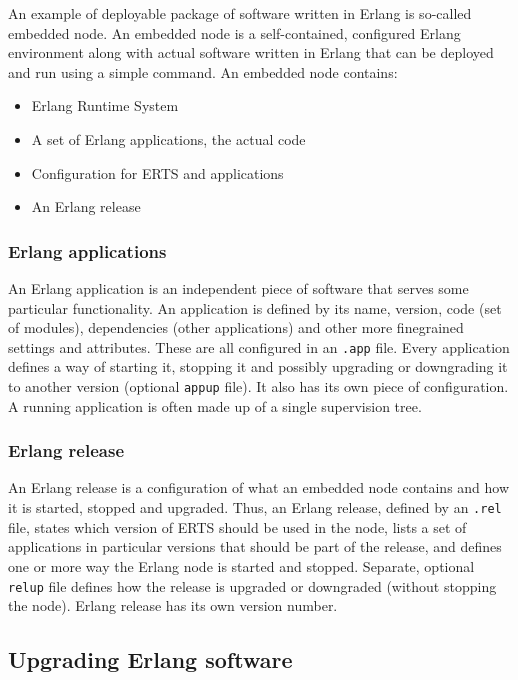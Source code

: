 An example of deployable package of software written in Erlang is so-called embedded
node. An embedded node is a self-contained, configured Erlang environment along with actual software
written in Erlang that can be deployed and run using a simple command. An embedded node contains:
\begin{itemize}
\item Erlang Runtime System
\item A set of Erlang applications, the actual code
\item Configuration for ERTS and applications
\item An Erlang release
\end{itemize}

\subsubsection{Erlang applications}

An Erlang application is an independent piece of software that serves some particular
functionality. An application is defined by its name, version, code (set of modules),
dependencies (other applications) and other more finegrained settings and attributes. These are all
configured in an {\tt .app} file. Every application defines a way of starting it, stopping it and possibly
upgrading or downgrading it to another version (optional {\tt appup} file). It also has its own piece of configuration.
A running application is often made up of a single supervision tree.

\subsubsection{Erlang release}

An Erlang release is a configuration of what an embedded node contains and how it is
started, stopped and upgraded. Thus, an Erlang release, defined by an {\tt .rel} file,
states which version of ERTS should be used in the node, lists a set of applications in 
particular versions that should be part of the release, and defines one or more way the
Erlang node is started and stopped. Separate, optional {\tt relup} file defines how the
release is upgraded or downgraded (without stopping the node).
Erlang release has its own version number.

\subsection{Upgrading Erlang software}

